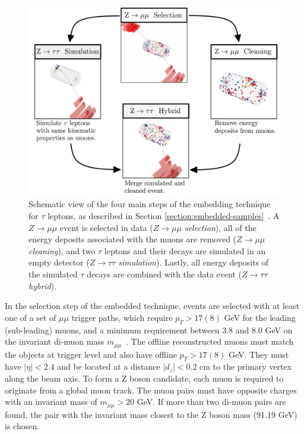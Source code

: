 \begin{figure}[ht]
    \centering
    \includegraphics[width=13cm]{figures/ch-4-datasets-monte-carlo/embedded_schematic}
    \caption[Schematic view of the four main steps of the embedding technique for $\tau$ leptons.]{Schematic view of the four main steps of the embedding technique for $\tau$ leptons, as described in Section \ref{section:embedded-samples}~\cite{CMS-TAU-18-001}. A $Z \rightarrow \mu\mu$ event is selected in data (\textit{$Z\rightarrow \mu\mu$ selection}), all of the energy deposits associated with the muons are removed (\textit{$Z \rightarrow \mu\mu$ cleaning}), and two $\tau$ leptons and their decays are simulated in an empty detector (\textit{$Z \rightarrow \tau\tau$ simulation}). Lastly, all energy deposits of the simulated $\tau$ decays are combined with the data event (\textit{$Z \rightarrow \tau\tau$ hybrid}).} 
    \label{fig:embedded-schematic}
\end{figure}

In the selection step of the embedded technique, events are selected with at least one of a set of $\mu\mu$ trigger paths, which require $p_{T} > 17 (8)$ GeV for the leading (sub-leading) muons, and a minimum requirement between 3.8 and 8.0 GeV on the invariant di-muon mass $m_{\mu\mu}$~\cite{CMS-TAU-18-001}. The offline reconstructed muons must match the objects at trigger level and also have offline $p_{T} > 17 (8)$ GeV. They must have $|\eta| < 2.4$ and be located at a  distance $|d_z| < 0.2$ cm to the primary vertex along the beam axis. To form a Z boson candidate, each muon is required to originate from a global muon track. The muon pairs must have opposite charges with an invariant mass of $m_{\mu\mu} > 20$ GeV. If more than two di-muon pairs are found, the pair with the invariant mass closest to the Z boson mass (91.19 GeV) is chosen. 

